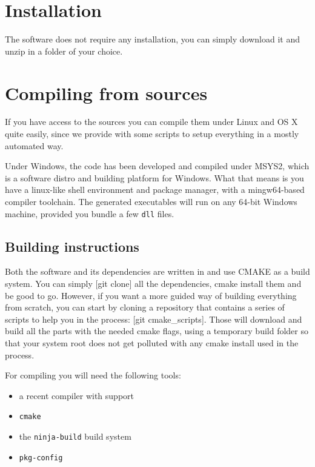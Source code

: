 \section{Installation}
The software does not require any installation, you can simply download it
and unzip in a folder of your choice. 

\section{Compiling from sources}

If you have access to the sources you can compile them under Linux and OS X
quite easily, since we provide with some scripts to setup everything
in a mostly automated way.

Under Windows, the code has been developed and compiled under MSYS2, which
is a software distro and building platform for Windows. What that means is
you have a linux-like shell environment and package manager, with a
mingw64-based compiler toolchain. The generated executables will run
on any 64-bit Windows machine, provided you bundle a few \texttt{dll} files.

\subsection{Building instructions}
Both the software and its dependencies are written in \CC and use CMAKE as a
build system. You can simply [git clone] all the dependencies, cmake install
them and be good to go.
However, if you want a more guided way of building everything from scratch,
you can start by cloning a repository that contains a series of scripts to help
you in the process: [git cmake\_scripts]. Those will download and build
all the parts with the needed cmake flags, using a temporary build folder
so that your system root does not get polluted with any cmake install used
in the process.

For compiling you will need the following tools:
\begin{itemize}
    \item a recent compiler with  support
    \item \texttt{cmake}
    \item the \texttt{ninja-build} build system
    \item \texttt{pkg-config}
\end{itemize}

